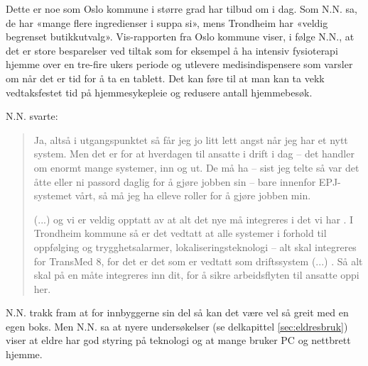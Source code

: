 Dette er noe som Oslo kommune i større grad har tilbud om i dag. Som N.N. sa, de har «mange flere ingredienser i suppa si», mens Trondheim
har «veldig begrenset butikkutvalg». Vis-rapporten fra Oslo kommune viser, i følge N.N., at det er store besparelser ved tiltak som
for eksempel å ha intensiv fysioterapi hjemme over en tre-fire ukers periode og utlevere  medisindispensere som varsler om når det er tid for
å ta en tablett. Det kan føre til at man kan ta vekk vedtaksfestet tid på hjemmesykepleie og redusere antall hjemmebesøk.

\textit{}

N.N. svarte:
\blockquote{Ja, altså i utgangspunktet så får jeg jo litt lett angst når jeg har et nytt system. Men det er
    for at hverdagen til ansatte i drift i dag -- det handler om
    enormt mange systemer, inn og ut. De må ha -- sist jeg telte så var det åtte eller ni passord daglig for å gjøre
    jobben sin -- bare innenfor EPJ-systemet vårt, så må
    jeg ha elleve roller for å gjøre jobben min.

(...) og vi er veldig opptatt av at alt det nye må integreres i det vi har . I Trondheim kommune så er det
vedtatt at alle systemer i forhold til oppfølging og
trygghetsalarmer, lokaliseringsteknologi -- alt skal integreres for TransMed 8, for det er det som er vedtatt som driftssystem (...)
. Så alt skal på en måte integreres inn dit, for å sikre arbeidsflyten til ansatte oppi her.}
N.N. trakk fram at for innbyggerne sin del så kan det være vel så greit med en egen boks. Men N.N. sa at nyere
undersøkelser (se delkapittel \ref{sec:eldresbruk}) viser at eldre har god styring på teknologi og at mange bruker
PC og nettbrett hjemme.
